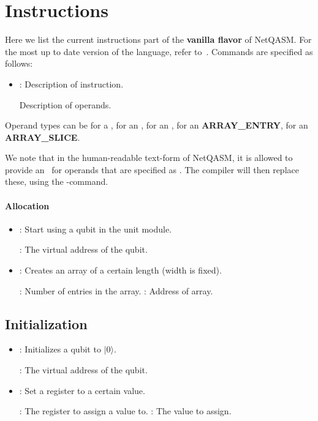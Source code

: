 \section{Instructions}
\label{netqasm:sec:instructions}
Here we list the current instructions part of the \textbf{vanilla flavor} of \ac{NetQASM}.
For the most up to date version of the language, refer to~\cite{git_netqasm}.
Commands are specified as follows:
\begin{itemize}
  \item {}: Description of instruction.
  
        Description of operands.
\end{itemize}
Operand types can be  for a \REGISTER,  for an \IMMEDIATE,  for an \ADDRESS,  for an \textbf{ARRAY\_ENTRY},  for an \textbf{ARRAY\_SLICE}.

We note that in the human-readable text-form of \ac{NetQASM}, it is allowed to provide an \IMMEDIATE\ for operands that are specified as \REGISTER.
The compiler will then replace these, using the -command.

\paragraph{Allocation}

\begin{itemize}
  \item {}: Start using a qubit in the unit module.

        : The virtual address of the qubit.
  \item {}: Creates an array of a certain length (width is fixed).

        : Number of entries in the array.
        : Address of array.
\end{itemize}


\subsection{Initialization}

\begin{itemize}
  \item {}: Initializes a qubit to $|0\rangle$.

        : The virtual address of the qubit.
  \item {}: Set a register to a certain value.

        : The register to assign a value to.
        : The value to assign.
\end{itemize}

